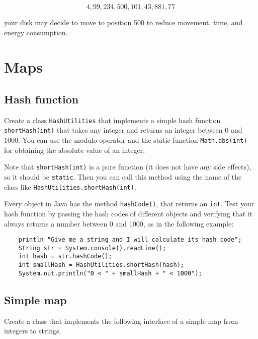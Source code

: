 \documentclass{article}
\begin{document}
$$4, 99, 234, 500, 101, 43, 881, 77$$

your disk may decide to move to position
500 to reduce movement, time, and energy consumption.

\section{Maps}
\label{sec:using-maps}

\subsection{Hash function}
\label{sec:hash-function}

Create a class \verb+HashUtilities+ that implements a simple hash
function \verb+shortHash(int)+ that takes any integer and returns an
integer between 0 and 1000. You can use the modulo operator and the
static function \verb+Math.abs(int)+ for obtaining the absolute value
of an integer. 

Note that \verb+shortHash(int)+ is a pure function (it 
does not have any side effects),
so it should be \verb+static+. Then you can call this method using the
name of the class like \verb+HashUtilities.shortHash(int)+. 

Every object in Java has the method \verb+hashCode()+, that returns an
\verb+int+. Test your hash function by passing the hash codes of
different objects and verifying that it always returns a number
between 0 and 1000, as in the following example:

\begin{verbatim}
    println "Give me a string and I will calculate its hash code";
    String str = System.console().readLine(); 
    int hash = str.hashCode();
    int smallHash = HashUtilities.shortHash(hash);
    System.out.println("0 < " + smallHash + " < 1000");
\end{verbatim}

\subsection{Simple map}
\label{sec:simple-map-1}

Create a class that implements the following interface of a simple map
from integers to strings. 
\end{document}
